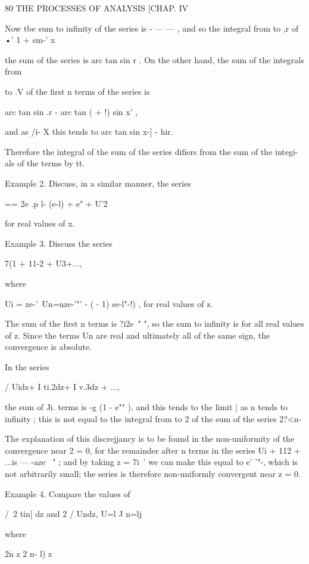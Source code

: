 80 THE PROCESSES OF ANALYSIS [CHAP. IV

Now tbe sum to infinity of the series is - — — , and so the integral
from to ,r of •' 1 + sm-' x

the sum of the series is arc tan sin r . On the other hand, the sum of
the integrals from

to .V of the first n terms of the series is

arc tan sin .r - arc tan ( + !) sin x' ,

and as /i- X this tends to arc tan sin x-] - hir.

Therefore the integral of the sum of the series difiers from the sum
of the integi-als of the terms by tt.

Example 2. Discuss, in a similar manner, the series

== 2e .p l- (e-l) + e" + U'2

for real values of x.

Example 3. Discuss the series

7(1 + 11-2 + U3+...,

where

Ui = ze-'\ Un=nze-'"' - ( - 1) se-l"-!) , for real values of z.

The sum of the first n terms is ?i2e~" ", so the sum to infinity is
for all real values of z. Since the terms Un are real and ultimately
all of the same sign, the convergence is absolute.



In the series



/ Uidz+ I ti.2dz+ I v.3dz + ...,



the sum of Ji. terms is -g (1 - e"" ), and this tends to the limit |
as n tends to infinity ; this is not equal to the integral from to 2
of the sum of the series 2?<n-

The explanation of this discrejjancy is to be found in the
non-uniformity of the convergence near 2 = 0, for the remainder after
n terms in the series Ui + 112 + ...is — -aze~ " ; and by taking z =
7i~' we can make this equal to e' '"-, which is not arbitrarily small;
the series is therefore non-uniformly convergent near z = 0.

Example 4. Compare the values of

/\ 2 tin[ dz and 2 / Undz, U=l J n=lj

where

2n z 2 n- l) z



